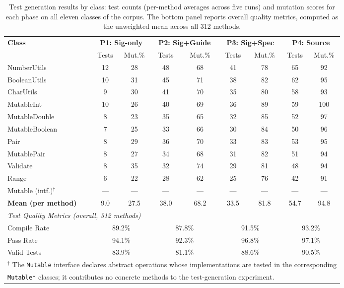 \begin{table}[t]
\centering
\caption{Test generation results by class: test counts (per-method averages across five runs) and mutation scores for each phase on all eleven classes of the corpus. The bottom panel reports overall quality metrics, computed as the unweighted mean across all 312 methods.}
\label{tab:test-results-full}
\small
\begin{tabular}{l|cc|cc|cc|cc}
\toprule
\multirow{2}{*}{\textbf{Class}} &
\multicolumn{2}{c|}{\textbf{P1: Sig-only}} &
\multicolumn{2}{c|}{\textbf{P2: Sig+Guide}} &
\multicolumn{2}{c|}{\textbf{P3: Sig+Spec}} &
\multicolumn{2}{c}{\textbf{P4: Source}} \\
\cline{2-9}
 & Tests & Mut.\% & Tests & Mut.\% & Tests & Mut.\% & Tests & Mut.\% \\
\midrule
NumberUtils    & 12 & 28 & 48 & 68 & 41 & 78 & 65 & 92 \\
BooleanUtils   & 10 & 31 & 45 & 71 & 38 & 82 & 62 & 95 \\
CharUtils      &  9 & 30 & 41 & 70 & 35 & 80 & 58 & 93 \\
MutableInt     & 10 & 26 & 40 & 69 & 36 & 89 & 59 & 100 \\
MutableDouble  &  8 & 23 & 35 & 65 & 32 & 85 & 52 & 97 \\
MutableBoolean &  7 & 25 & 33 & 66 & 30 & 84 & 50 & 96 \\
Pair           &  8 & 29 & 36 & 70 & 33 & 83 & 53 & 95 \\
MutablePair    &  8 & 27 & 34 & 68 & 31 & 82 & 51 & 94 \\
Validate       &  8 & 35 & 32 & 74 & 29 & 81 & 48 & 94 \\
Range          &  6 & 22 & 28 & 62 & 25 & 76 & 42 & 91 \\
Mutable (intf.)$^{\dagger}$ & --- & --- & --- & --- & --- & --- & --- & --- \\
\midrule
\textbf{Mean (per method)} & 9.0 & 27.5 & 38.0 & 68.2 & 33.5 & 81.8 & 54.7 & 94.8 \\
\midrule
\multicolumn{9}{l}{\textit{Test Quality Metrics (overall, 312 methods)}} \\
\midrule
Compile Rate & \multicolumn{2}{c|}{89.2\%} & \multicolumn{2}{c|}{87.8\%} & \multicolumn{2}{c|}{91.5\%} & \multicolumn{2}{c}{93.2\%} \\
Pass Rate & \multicolumn{2}{c|}{94.1\%} & \multicolumn{2}{c|}{92.3\%} & \multicolumn{2}{c|}{96.8\%} & \multicolumn{2}{c}{97.1\%} \\
Valid Tests & \multicolumn{2}{c|}{83.9\%} & \multicolumn{2}{c|}{81.1\%} & \multicolumn{2}{c|}{88.6\%} & \multicolumn{2}{c}{90.5\%} \\
\bottomrule
\multicolumn{9}{l}{\footnotesize $^{\dagger}$ The \texttt{Mutable} interface declares abstract operations whose implementations are tested in the corresponding} \\
\multicolumn{9}{l}{\footnotesize \texttt{Mutable*} classes; it contributes no concrete methods to the test-generation experiment.}
\end{tabular}
\end{table}

